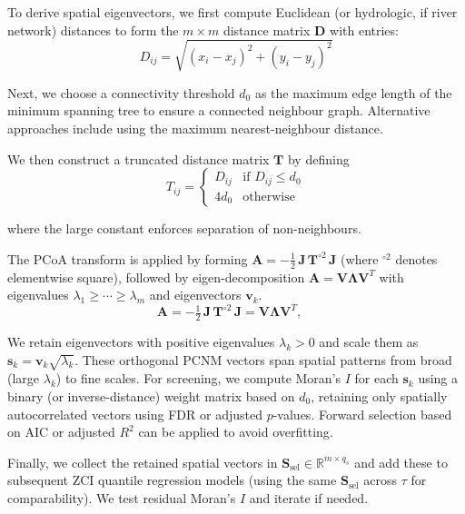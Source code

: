 To derive spatial eigenvectors, we first compute Euclidean (or hydrologic, if river network) 
distances to form the $m\times m$ distance matrix $\mathbf{D}$ with entries:
\[
D_{ij}=\sqrt{(x_i-x_j)^2+(y_i-y_j)^2}
\]

Next, we choose a connectivity threshold $d_0$ as the maximum edge length of the minimum spanning tree to ensure a connected neighbour graph. Alternative approaches include using the maximum nearest-neighbour distance.

We then construct a truncated distance matrix $\mathbf{T}$ by defining 
\[
T_{ij} = \begin{cases}
D_{ij} & \text{if } D_{ij} \le d_0 \\
4d_0 & \text{otherwise}
\end{cases}
\]

where the large constant enforces separation of non-neighbours. 

The PCoA transform is applied by forming $\mathbf{A} = -\tfrac{1}{2}\,\mathbf{J}\,\mathbf{T}^{\circ 2}\,\mathbf{J}$ (where $^{\circ 2}$ denotes elementwise square), followed by eigen-decomposition $\mathbf{A}=\mathbf{V}\boldsymbol{\Lambda}\mathbf{V}^T$ with eigenvalues $\lambda_1\ge\cdots\ge\lambda_m$ and eigenvectors $\mathbf{v}_k$.
\[
\mathbf{A} = -\tfrac{1}{2}\,\mathbf{J}\,\mathbf{T}^{\circ 2}\,\mathbf{J} = \mathbf{V}\boldsymbol{\Lambda}\mathbf{V}^T, \quad
\]

We retain eigenvectors with positive eigenvalues $\lambda_k>0$ and 
scale them as $\mathbf{s}_k=\mathbf{v}_k\sqrt{\lambda_k}$. 
These orthogonal PCNM vectors span spatial patterns from broad (large $\lambda_k$) 
to fine scales. For screening, we compute Moran's $I$ for each $\mathbf{s}_k$ 
using a binary (or inverse-distance) weight matrix based on $d_0$, 
retaining only spatially autocorrelated vectors using FDR or adjusted $p$-values.
 Forward selection based on AIC or adjusted $R^2$ can be applied to avoid overfitting.

Finally, we collect the retained spatial vectors in $\mathbf{S}_{\text{sel}}\in\mathbb{R}^{m\times q_s}$ and add these to subsequent ZCI quantile regression models (using the same $\mathbf{S}_{\text{sel}}$ across $\tau$ for comparability). We test residual Moran's $I$ and iterate if needed.





